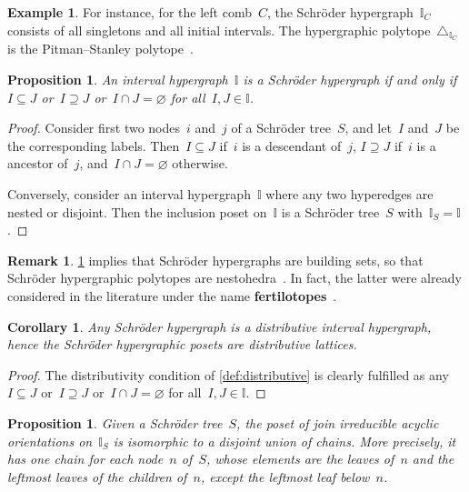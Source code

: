 \documentclass{amsart}
\newtheorem{corollary}[theorem]{Corollary}
\newtheorem{proposition}[theorem]{Proposition}
\theoremstyle{definition}
\newtheorem{example}[theorem]{Example}
\newtheorem{remark}[theorem]{Remark}
\newcommand{\defn}[1]{\textbf{\textsf{\color{PineGreen} #1}}} %
\newcommand{\II}{\mathbb I} %
\begin{document}
\begin{example}
For instance, for the left comb~$C$, the Schr\"oder hypergraph~$\II_C$ consists of all singletons and all initial intervals. The hypergraphic polytope~$\triangle_{\II_C}$ is the Pitman--Stanley polytope~\cite{PitmanStanley}.
\end{example}

\begin{proposition}
\label{prop:characterizationSchroder}
An interval hypergraph~$\II$ is a Schr\"oder hypergraph if and only if~$I \subseteq J$ or~$I \supseteq J$ or~$I \cap J = \varnothing$ for all~$I,J \in \II$.
\end{proposition}

\begin{proof}
Consider first two nodes~$i$ and~$j$ of a Schr\"oder tree~$S$, and let~$I$ and~$J$ be the corresponding labels.
Then~$I \subseteq J$ if~$i$ is a descendant of~$j$, $I \supseteq J$ if~$i$ is a ancestor of~$j$, and~$I \cap J = \varnothing$ otherwise.

Conversely, consider an interval hypergraph~$\II$ where any two hyperedges are nested or disjoint. Then the inclusion poset on~$\II$ is a Schr\"oder tree~$S$ with~$\II_S = \II$.
\end{proof}

\begin{remark}
\cref{prop:characterizationSchroder} implies that Schr\"oder hypergraphs are building sets, so that Schr\"oder hypergraphic polytopes are nestohedra~\cite{FeichtnerSturmfels,Postnikov}.
In fact, the latter were already considered in the literature under the name \defn{fertilotopes}~\cite{Defant-fertilitopes}.
\end{remark}

\begin{corollary}
Any Schr\"oder hypergraph is a distributive interval hypergraph, hence the Schr\"oder hypergraphic posets are distributive lattices.
\end{corollary}

\begin{proof}
The distributivity condition of \cref{def:distributive} is clearly fulfilled as any~$I \subseteq J$ or~$I \supseteq J$ or~$I \cap J = \varnothing$ for all~$I,J \in \II$.
\end{proof}

\begin{proposition}
Given a Schr\"oder tree~$S$, the poset of join irreducible acyclic orientations on~$\II_S$ is isomorphic to a disjoint union of chains.
More precisely, it has one chain for each node~$n$ of~$S$, whose elements are the leaves of~$n$ and the leftmost leaves of the children of~$n$, except the leftmost leaf below~$n$.
\end{proposition}
\end{document}
